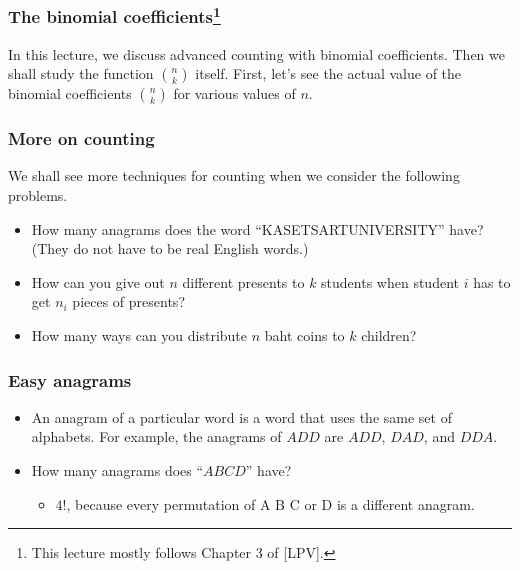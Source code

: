 

\begin{frame}\frametitle{The binomial coefficients\footnote{This lecture mostly follows Chapter 3 of [LPV].}}
  In this lecture, we discuss advanced counting with binomial
  coefficients.  Then we shall study the function $\binom{n}{k}$
  itself.  First, let's see the actual value of the binomial
  coefficients $\binom{n}{k}$ for various values of $n$.  \vspace{2in}
\end{frame}

\begin{frame}\frametitle{More on counting}
  We shall see more techniques for counting when we consider the
  following problems.
  \begin{itemize}
  \item How many anagrams does the word ``KASETSARTUNIVERSITY'' have?
    (They do not have to be real English words.)
  \item How can you give out $n$ different presents to $k$ students
    when student $i$ has to get $n_i$ pieces of presents?
  \item How many ways can you distribute $n$ baht coins to $k$
    children?
  \end{itemize}
\end{frame}

\begin{frame}\frametitle{Easy anagrams}
  \begin{itemize}
  \item An anagram of a particular word is a word that uses the same
    set of alphabets.  For example, the anagrams of $ADD$ are $ADD$,
    $DAD$, and $DDA$. \pause
  \item How many anagrams does ``$ABCD$'' have? \pause
    \begin{itemize}
    \item $4!$, because every permutation of A B C or D is a different
      anagram. \pause
    \end{itemize}
  \end{itemize}
\end{frame}

